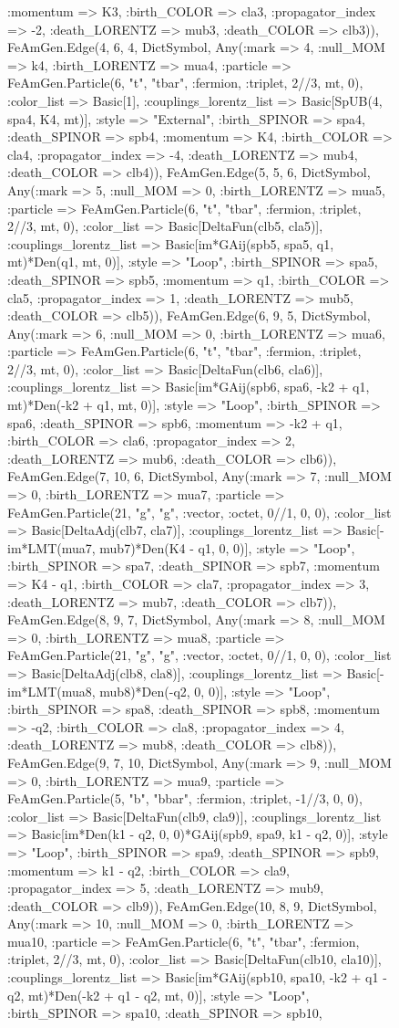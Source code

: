 \documentclass{revtex4}
\begin{document}
\begin{figure}[!htb]
\begin{center}
{:momentum => K3, :birth_COLOR => cla3, :propagator_index => -2, :death_LORENTZ => mub3, :death_COLOR => clb3)), FeAmGen.Edge(4, 6, 4, Dict{Symbol, Any}(:mark => 4, :null_MOM => k4, :birth_LORENTZ => mua4, :particle => FeAmGen.Particle(6, "t", "tbar", :fermion, :triplet, 2//3, mt, 0), :color_list => Basic[1], :couplings_lorentz_list => Basic[SpUB(4, spa4, K4, mt)], :style => "External", :birth_SPINOR => spa4, :death_SPINOR => spb4, :momentum => K4, :birth_COLOR => cla4, :propagator_index => -4, :death_LORENTZ => mub4, :death_COLOR => clb4)), FeAmGen.Edge(5, 5, 6, Dict{Symbol, Any}(:mark => 5, :null_MOM => 0, :birth_LORENTZ => mua5, :particle => FeAmGen.Particle(6, "t", "tbar", :fermion, :triplet, 2//3, mt, 0), :color_list => Basic[DeltaFun(clb5, cla5)], :couplings_lorentz_list => Basic[im*GAij(spb5, spa5, q1, mt)*Den(q1, mt, 0)], :style => "Loop", :birth_SPINOR => spa5, :death_SPINOR => spb5, :momentum => q1, :birth_COLOR => cla5, :propagator_index => 1, :death_LORENTZ => mub5, :death_COLOR => clb5)), FeAmGen.Edge(6, 9, 5, Dict{Symbol, Any}(:mark => 6, :null_MOM => 0, :birth_LORENTZ => mua6, :particle => FeAmGen.Particle(6, "t", "tbar", :fermion, :triplet, 2//3, mt, 0), :color_list => Basic[DeltaFun(clb6, cla6)], :couplings_lorentz_list => Basic[im*GAij(spb6, spa6, -k2 + q1, mt)*Den(-k2 + q1, mt, 0)], :style => "Loop", :birth_SPINOR => spa6, :death_SPINOR => spb6, :momentum => -k2 + q1, :birth_COLOR => cla6, :propagator_index => 2, :death_LORENTZ => mub6, :death_COLOR => clb6)), FeAmGen.Edge(7, 10, 6, Dict{Symbol, Any}(:mark => 7, :null_MOM => 0, :birth_LORENTZ => mua7, :particle => FeAmGen.Particle(21, "g", "g", :vector, :octet, 0//1, 0, 0), :color_list => Basic[DeltaAdj(clb7, cla7)], :couplings_lorentz_list => Basic[-im*LMT(mua7, mub7)*Den(K4 - q1, 0, 0)], :style => "Loop", :birth_SPINOR => spa7, :death_SPINOR => spb7, :momentum => K4 - q1, :birth_COLOR => cla7, :propagator_index => 3, :death_LORENTZ => mub7, :death_COLOR => clb7)), FeAmGen.Edge(8, 9, 7, Dict{Symbol, Any}(:mark => 8, :null_MOM => 0, :birth_LORENTZ => mua8, :particle => FeAmGen.Particle(21, "g", "g", :vector, :octet, 0//1, 0, 0), :color_list => Basic[DeltaAdj(clb8, cla8)], :couplings_lorentz_list => Basic[-im*LMT(mua8, mub8)*Den(-q2, 0, 0)], :style => "Loop", :birth_SPINOR => spa8, :death_SPINOR => spb8, :momentum => -q2, :birth_COLOR => cla8, :propagator_index => 4, :death_LORENTZ => mub8, :death_COLOR => clb8)), FeAmGen.Edge(9, 7, 10, Dict{Symbol, Any}(:mark => 9, :null_MOM => 0, :birth_LORENTZ => mua9, :particle => FeAmGen.Particle(5, "b", "bbar", :fermion, :triplet, -1//3, 0, 0), :color_list => Basic[DeltaFun(clb9, cla9)], :couplings_lorentz_list => Basic[im*Den(k1 - q2, 0, 0)*GAij(spb9, spa9, k1 - q2, 0)], :style => "Loop", :birth_SPINOR => spa9, :death_SPINOR => spb9, :momentum => k1 - q2, :birth_COLOR => cla9, :propagator_index => 5, :death_LORENTZ => mub9, :death_COLOR => clb9)), FeAmGen.Edge(10, 8, 9, Dict{Symbol, Any}(:mark => 10, :null_MOM => 0, :birth_LORENTZ => mua10, :particle => FeAmGen.Particle(6, "t", "tbar", :fermion, :triplet, 2//3, mt, 0), :color_list => Basic[DeltaFun(clb10, cla10)], :couplings_lorentz_list => Basic[im*GAij(spb10, spa10, -k2 + q1 - q2, mt)*Den(-k2 + q1 - q2, mt, 0)], :style => "Loop", :birth_SPINOR => spa10, :death_SPINOR => spb10, }
\end{center}
\end{figure}
\end{document}
